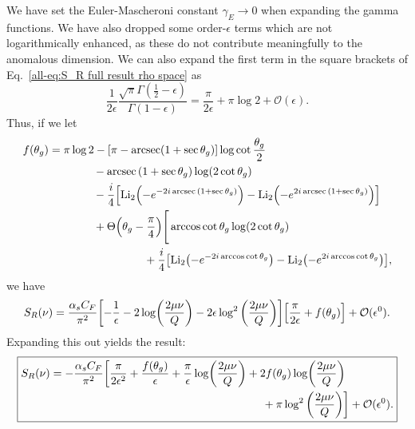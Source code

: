 \documentclass[../thesis.tex]{subfiles}
\providecommand{\Li}{\mathrm{Li}}
\providecommand{\cO}{\mathcal{O}}
\begin{document}
	We have set the Euler-Mascheroni constant $\gamma_E \to 0$ when expanding the gamma functions. We have also dropped some order-$\epsilon$ terms which are not logarithmically enhanced, as these do not contribute meaningfully to the anomalous dimension. We can also expand the first term in the square brackets of Eq.~\ref{all-eq:S_R full result rho space} as
	\begin{equation}
		\frac{1}{2\epsilon}\frac{\sqrt{\pi} \Gamma(\frac{1}{2} - \epsilon)}{\Gamma(1 - \epsilon)} = \frac{\pi}{2\epsilon} + \pi \log 2 + \cO(\epsilon).
	\end{equation}
	Thus, if we let
	\begin{equation}\label{all-eq:f definition}
	\begin{aligned}
		f(\theta_g) &= \pi \log 2 - \qty[\pi - \arcsec(1 + \sec\theta_g)]\log\cot\frac{\theta_g}{2} \\
			&\qquad\qquad - \arcsec\qty(1 + \sec\theta_g) \log(2\cot\theta_g) \\
			&\qquad\qquad - \frac{i}{4}\qty[\Li_2\qty(-e^{-2i\arcsec\qty(1 + \sec\theta_g)}) - \Li_2\qty(-e^{2i\arcsec\qty(1 + \sec\theta_g)})] \\
			&\qquad\qquad+ \Theta\qty(\theta_g - \frac{\pi}{4})\Bigg[ \arccos\cot\theta_g \log(2\cot\theta_g) \\
			&\hspace{3cm}+ \frac{i}{4}\qty[\Li_2\qty(-e^{-2i\arccos\cot\theta_g}) - \Li_2\qty(-e^{2i\arccos\cot\theta_g})],
	\end{aligned}
	\end{equation}
	we have
	\begin{equation}
		S_R(\nu) = \frac{\alpha_s C_F}{\pi^2}\qty[-\frac{1}{\epsilon} - 2\log(\frac{2\mu \nu}{Q}) - 2\epsilon\log^2\qty(\frac{2\mu \nu}{Q})]\qty[\frac{\pi}{2\epsilon} + f(\theta_g)] + \cO(\epsilon^0).
	\end{equation}
	Expanding this out yields the result:
	\begin{equation}\label{all-eq:soft function laplace expanded}
	\boxed{
	\begin{aligned}
		S_R(\nu) = -\frac{\alpha_s C_F}{\pi^2} \bigg[\frac{\pi}{2\epsilon^2} + \frac{f(\theta_g)}{\epsilon} + \frac{\pi}{\epsilon}\log(\frac{2\mu \nu}{Q}) &+ 2f(\theta_g)\log(\frac{2\mu\nu}{Q}) \\
			&\hspace{0.5cm}+ \pi\log^2\qty(\frac{2\mu \nu}{Q}) \bigg] + \cO(\epsilon^0).
	\end{aligned}
	}
	\end{equation}
\end{document}
